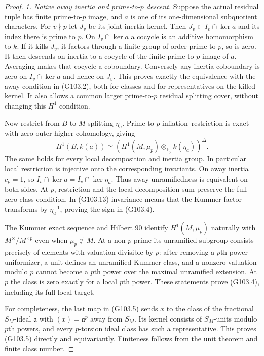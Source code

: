 \begin{proof}
\emph{1. Native away inertia and prime-to-$p$ descent.}
Suppose the actual residual tuple has finite prime-to-$p$ image,
and $a$ is one of its one-dimensional subquotient characters.
For $v\nmid p$ let $J_v$ be its joint inertia kernel.
Then $J_v\subset I_v\cap\ker a$ and its index there is prime
to $p$.  On $I_v\cap\ker a$ a cocycle is an additive
homomorphism to $k$.  If it kills $J_v$, it factors through a
finite group of order prime to $p$, so is zero.
It then descends on inertia to a cocycle of the finite
prime-to-$p$ image of $a$.  Averaging makes that cocycle a
coboundary.  Conversely any inertia coboundary is zero on
$I_v\cap\ker a$ and hence on $J_v$.
This proves exactly the equivalence with the away condition in
(G103.2), both for classes and for representatives on the killed
kernel.  It also allows a common larger prime-to-$p$ residual
splitting cover, without changing this $H^1$ condition.

Now restrict from $B$ to $M$ splitting $\eta_a$.
Prime-to-$p$ inflation--restriction is exact with zero outer
higher cohomology, giving
\[
 H^1(B,k(a))\simeq
       (H^1(M,\mu_p)\otimes_{\mathbb F_p}k(\eta_a))^\Delta.
 \tag{G103.13}
\]
The same holds for every local decomposition and inertia group.
In particular local restriction is injective onto the corresponding
invariants.  On away inertia $c_p=1$, so
$I_v\cap\ker a=I_v\cap\ker\eta_a$.
Thus away unramifiedness is equivalent on both sides.
At $p$, restriction and the local decomposition sum preserve the
full zero-class condition.
In (G103.13) invariance means that the Kummer factor transforms
by $\eta_a^{-1}$, proving the sign in (G103.4).

The Kummer exact sequence and Hilbert 90 identify
$H^1(M,\mu_p)$ naturally with $M^\times/M^{\times p}$ even
when $\mu_p\not\subset M$.
At a non-$p$ prime its unramified subgroup consists precisely
of elements with valuation divisible by $p$: after removing
a $p$th-power uniformizer, a unit defines an unramified Kummer
class, and a nonzero valuation modulo $p$ cannot become a
$p$th power over the maximal unramified extension.
At $p$ the class is zero exactly for a local $p$th power.
These statements prove (G103.4), including its full local target.

For completeness, the last map in (G103.5) sends $x$ to the
class of the fractional $S_M$-ideal $\mathfrak a$ with
$(x)=\mathfrak a^p$ away from $S_M$.
Its kernel consists of $S_M$-units modulo $p$th powers, and
every $p$-torsion ideal class has such a representative.
This proves (G103.5) directly and equivariantly.
Finiteness follows from the unit theorem and finite class number.


\end{proof}
